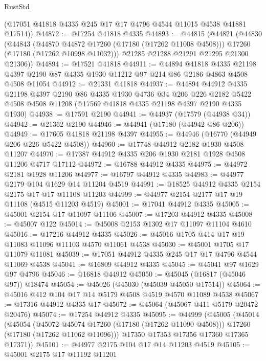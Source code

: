 \begin{lexlean}{RustStd}
\begin{coremodule}
{\begin{coremodule}
{{{{{{{{{{{{{{{{{{{{{{{{{{{{{{{{{{{{{{{{{{{{{{{{{{{{{{{      (@17051 @41818 @4335 @245 @17 @17 @4796 @4544 @11015 @4538 @41881 @17514))
@44872 := @17254 @41818 @4335
@44893 := @44815
    (@44821
      (@44830
        (@44843
          (@44870 @44872 @17260 (@17180 (@17262 @11008 @4508)))
          @17260
          (@17180 (@17262 @10998 @11032)))
        @21285
        @21288
        @21291
        @21295
        @21300
        @21306))
@44894 := @17521 @41818
@44911 := @44894
    @41818
    @4335
    @21198
    @4397
    @2190
    @87
    @4335
    @1930
    @11212
    @97
    @214
    @86
    @2186
    @4863
    @4508
    @4508
    @11054
@44912 := @21331 @41818
@44937 := @44894
    @44912
    @4335
    @21198
    @4397
    @2190
    @86
    @4335
    @1930
    @4736
    @34
    @206
    @226
    @2182
    @5422
    @4508
    @4508
    @11208
    (@17569 @41818 @4335 @21198 @4397 @2190 @4335 @1930)
@44938 := @17591 @2190
@44941 := @44937 (@17579 (@44938 @34))
@44942 := @21362 @2190
@44946 := @44941 (@17180 (@44942 @86 @206))
@44949 := @17605 @41818 @21198 @4397
@44955 := @44946 (@16770 (@44949 @206 @226 @5422 @4508))
@44960 := @17748 @44912 @2182 @1930 @4508 @11207
@44970 := @17387 @44912 @4335 @206 @1930 @2181 @1928 @4508 @11206 @4717 @17112
@44972 := @16788 @44912 @4335
@44975 := @44972 @2181 @1928 @11206
@44977 := @16797 @44912 @4335
@44983 := @44977 @2179 @104 @1629 @14 @11204 @4519
@44991 := @18525 @44912 @4335 @2154 @2175 @17 @17 @11108 @11203
@44999 := @44977 @2154 @2177 @17 @19 @11108 (@4515 @11203 @4519)
@45001 := @17041 @44912 @4335
@45005 := @45001 @2154 @17 @11097 @11106
@45007 := @17203 @44912 @4335
@45008 := @45007 @122
@45014 := @45008 @2153 @1302 @17 @11097 @11104 @4610
@45016 := @17216 @44912 @4335
@45026 := @45016 @1705 @414 @17 @19 @11083 @11096 @11103 @4570 @11061 @4538
@45030 := @45001 @1705 @17 @11079 @11081
@45039 := @17051 @44912 @4335 @245 @17 @17 @4796 @4544 @11069 @4538
@45041 := @16809 @44912 @4335
@45045 := @45041 @97 @1629 @97 @4796
@45046 := @16818 @44912
@45050 := @45045 (@16817 (@45046 @97)) @18474
@45054 := @45026 (@45030 (@45039 @45050 @17514))
@45064 := @45016 @412 @104 @17 @14 @5179 @4508 @4519 @4570 @11089 @4538
@45067 := @17316 @44912 @4335 @17
@45072 := @45064 (@45067 @411 @5179 @20472 @20476)
@45074 := @17254 @44912 @4335
@45095 := @44999
    (@45005
      (@45014
        (@45054
          (@45072 @45074 @17260 (@17180 (@17262 @11090 @4508)))
          @17260
          (@17180 (@17262 @11062 @11096)))
        @17350
        @17353
        @17356
        @17360
        @17365
        @17371))
@45101 := @44977 @2175 @104 @17 @14 @11203 @4519
@45105 := @45001 @2175 @17 @11192 @11201
}}}}}}}}}}}}}}}}}}}}}}}}}}}}}}}}}}}}}}}}}}}}}}}}}}}}}}}
\end{coremodule}}
\end{coremodule}
\end{lexlean}
